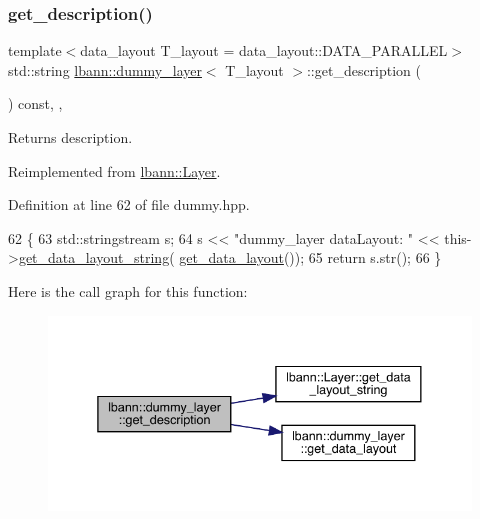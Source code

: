 \subsubsection{\texorpdfstring{get\+\_\+description()}{get\_description()}}
{\footnotesize\ttfamily template$<$data\+\_\+layout T\+\_\+layout = data\+\_\+layout\+::\+D\+A\+T\+A\+\_\+\+P\+A\+R\+A\+L\+L\+EL$>$ \\
std\+::string \hyperlink{classlbann_1_1dummy__layer}{lbann\+::dummy\+\_\+layer}$<$ T\+\_\+layout $>$\+::get\+\_\+description (\begin{DoxyParamCaption}{ }\end{DoxyParamCaption}) const\hspace{0.3cm}{\ttfamily [inline]}, {\ttfamily [override]}, {\ttfamily [virtual]}}

Returns description. 

Reimplemented from \hyperlink{classlbann_1_1Layer_acc0803d3428914ca1eb5988c4309174a}{lbann\+::\+Layer}.



Definition at line 62 of file dummy.\+hpp.


\begin{DoxyCode}
62                                              \{
63     std::stringstream s;
64      s << \textcolor{stringliteral}{"dummy\_layer  dataLayout: "} << this->\hyperlink{classlbann_1_1Layer_ae3f4a5602df821f4221614b1e3782dc1}{get\_data\_layout\_string}(
      \hyperlink{classlbann_1_1dummy__layer_a3cc37758086f3c4824619504e4ee869b}{get\_data\_layout}());
65      \textcolor{keywordflow}{return} s.str();
66   \}
\end{DoxyCode}
Here is the call graph for this function\+:\nopagebreak
\begin{figure}[H]
\begin{center}
\leavevmode
\includegraphics[width=338pt]{classlbann_1_1dummy__layer_ab4921788ac99636ba95ba51aaa4394fe_cgraph}
\end{center}
\end{figure}
\mbox{\label{classlbann_1_1dummy__layer_a060a484950e1ba36ce49bb2af3e409ec}} 
